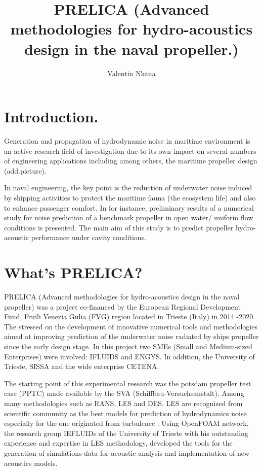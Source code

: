 \documentclass[10pt,a4paper,twoside]{article}
\author{Valentin Nkana}
\title{PRELICA (Advanced methodologies for hydro-acoustics design in the naval propeller.)}
\begin{document}
	
\maketitle
	
	
\section{Introduction.}

Generation and propagation of hydrodynamic noise in maritime environment is an active research field of investigation due to its own impact on several numbers of engineering applications including among others, the maritime propeller design (add.picture). 

In naval engineering, the key point is the reduction of underwater noise induced by shipping activities to protect the maritime fauna (the ecosystem life) and also to enhance passenger comfort. In \cite{sezen2020numerical} for instance,  preliminary results of a numerical study for noise prediction of a benchmark propeller in open water/ uniform flow conditions is presented. The main aim of this study is to predict propeller hydro-acoustic performance under cavity conditions.

\section{What's PRELICA?}

PRELICA (Advanced methodologies for hydro-acoustics design in the naval propeller) was a project co-financed by the European Regional Development Fund, Fruili Venezia Gulia (FVG) region located in Trieste (Italy) in 2014 -2020. The stressed on the development of innovative numerical tools and methodologies aimed at improving prediction of the underwater noise radiated by ships propeller since the early design stage. In this project two SMEs (Small and Medium-sized Enterprises) were involved: IFLUIDS and ENGYS. In addition, the University of Trieste, SISSA and the wide enterprise CETENA.


The starting point of this experimental research was the  potsdam propeller test case (PPTC) made available by the SVA (Schiffbau-Versuchsanstalt). Among many methodologies such as RANS, LES and DES. LES are recognized from scientific community as the best models for prediction of hydrodynamics noise especially for the one originated from  turbulence \cite{delafosse2008and}. Using OpenFOAM network, the research group IEFLUIDs of  the University of Trieste with his outstanding experience and expertise in LES methodology, developed the tools for the generation of simulations data for acoustic analysis and implementation of new acoustics models.  
\end{document}
